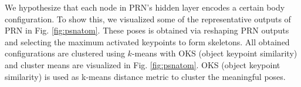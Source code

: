 \documentclass[runningheads]{llncs}
\begin{document}






We hypothesize that each node in PRN's hidden layer encodes a certain body configuration. To show this, we visualized some of the representative outputs of PRN in Fig. \ref{fig:psnatom}. These poses is obtained via reshaping PRN outputs and selecting the maximum activated keypoints to form skeletons. All obtained configurations are clustered using $k$-means with OKS (object keypoint similarity)\cite{Lin2014} and cluster means are visualized in Fig. \ref{fig:psnatom}. OKS (object keypoint similarity) is used as k-means distance metric to cluster the meaningful poses.
 
\end{document}
